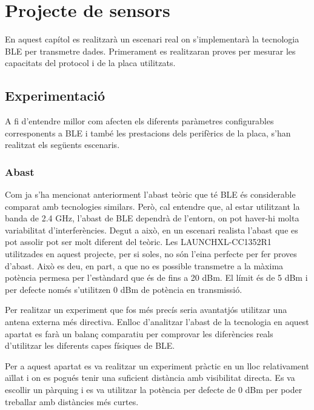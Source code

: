 \chapter{Projecte de sensors}
En aquest capítol es realitzarà un escenari real on s'implementarà la tecnologia BLE per transmetre dades.
Primerament es realitzaran proves per mesurar les capacitats del protocol i de la placa utilitzats.

\section{Experimentació}
A fi d'entendre millor com afecten els diferents paràmetres configurables corresponents a BLE i també les prestacions dels perifèrics de la placa, s'han realitzat els següents escenaris.


\subsection{Abast}

Com ja s'ha mencionat anteriorment l'abast teòric que té BLE és considerable comparat amb tecnologies similars.
Però, cal entendre que, al estar utilitzant la banda de 2.4 GHz, l'abast de BLE dependrà de l'entorn, on pot haver-hi molta variabilitat d'interferències.
Degut a això, en un escenari realista l'abast que es pot assolir pot ser molt diferent del teòric.
Les LAUNCHXL-CC1352R1 utilitzades en aquest projecte, per si soles, no són l'eina perfecte per fer proves d'abast.
Això es deu, en part, a que no es possible transmetre a la màxima potència permesa per l'estàndard que és de fins a 20 dBm.
El límit és de 5 dBm i per defecte només s'utilitzen 0 dBm de potència en transmissió.

Per realitzar un experiment que fos més precís seria avantatjós utilitzar una antena externa més directiva.
Enlloc d'analitzar l'abast de la tecnologia en aquest apartat es farà un balanç comparatiu per comprovar les diferències reals d'utilitzar les diferents capes físiques de BLE.

Per a aquest apartat es va realitzar un experiment pràctic en un lloc relativament aïllat i on es pogués tenir una suficient distància amb visibilitat directa.
Es va escollir un pàrquing i es va utilitzar la potència per defecte de 0 dBm per poder treballar amb distàncies més curtes.

